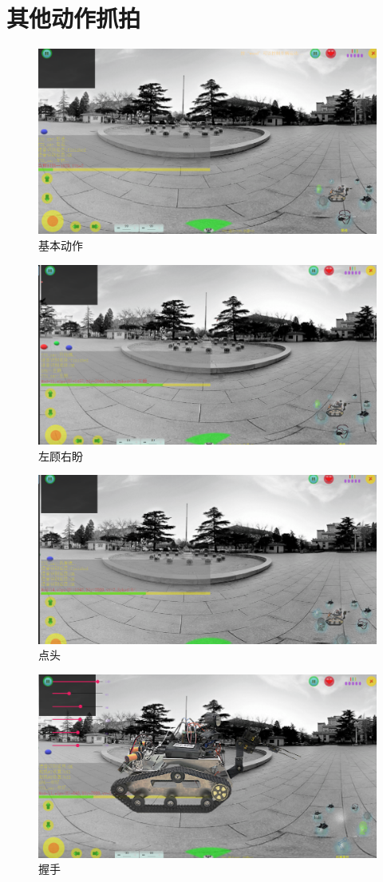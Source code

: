 \documentclass{ctexart}
\begin{document}
\section{其他动作抓拍}
\begin{figure}[H]
    \centering
    \includegraphics[width = .8\textwidth]{./figure/前后左右.png}
    \caption{基本动作}
\end{figure}
\begin{figure}[H]
    \centering
    \includegraphics[width = .8\textwidth]{./figure/左顾右盼.png}
    \caption{左顾右盼}
\end{figure}
\begin{figure}[H]
    \centering
    \includegraphics[width = .8\textwidth]{./figure/点头.png}
    \caption{点头}
\end{figure}
\begin{figure}[H]
    \centering
    \includegraphics[width = .8\textwidth]{./figure/握手.png}
    \caption{握手}
\end{figure}
\end{document}

